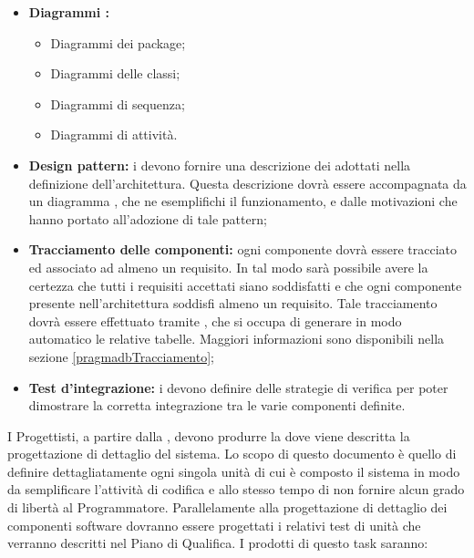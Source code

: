 \begin{itemize}
\item \textbf{Diagrammi :}
\begin{itemize}
\item Diagrammi dei package;
\item Diagrammi delle classi;
\item Diagrammi di sequenza;
\item Diagrammi di attività.
\end{itemize}
\item \textbf{Design pattern:} i \rPs devono fornire una descrizione dei  adottati nella definizione dell'architettura. Questa descrizione dovrà essere accompagnata da un diagramma , che ne esemplifichi il funzionamento, e dalle motivazioni che hanno portato all'adozione di tale pattern;
\item \textbf{Tracciamento delle componenti:} ogni componente dovrà essere tracciato ed associato ad almeno un requisito. In tal modo sarà possibile avere la certezza che tutti i requisiti accettati siano soddisfatti e che ogni componente presente nell'architettura soddisfi almeno un requisito. Tale tracciamento dovrà essere effettuato tramite \pragmadb, che si occupa di generare in modo automatico le relative tabelle. Maggiori informazioni sono disponibili nella sezione \ref{pragmadbTracciamento};
\item \textbf{Test d'integrazione:} i \rPs devono definire delle strategie di verifica per poter dimostrare la corretta integrazione tra le varie componenti definite.
\end{itemize}
I Progettisti, a partire dalla \ST, devono produrre la \DP dove viene descritta la progettazione di dettaglio del sistema.
Lo scopo di questo documento è quello di definire dettagliatamente ogni singola unità
di cui è composto il sistema in modo da semplificare l’attività di codifica e allo stesso
tempo di non fornire alcun grado di libertà al Programmatore.
Parallelamente alla progettazione di dettaglio dei componenti software dovranno essere
progettati i relativi test di unità che verranno descritti nel Piano di Qualifica.
I prodotti di questo task saranno:
